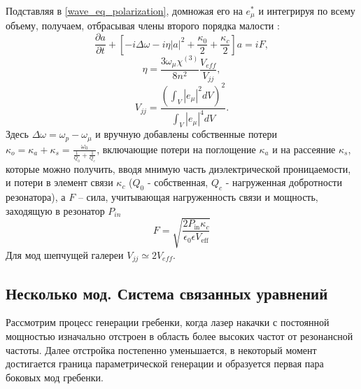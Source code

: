 Подставляя в \eqref{wave_eq_polarization}, домножая его на $e_\mu^*$ и интегрируя по всему объему, получаем, отбрасывая члены второго порядка малости \cite{Gorodetsky}:
\begin{equation}
\frac{\partial a}{\partial t}+[-i\Delta\omega-i\eta|a|^2+\frac{\kappa_0}{2}+\frac{\kappa_c}{2}]a=iF,
\end{equation}
\begin{equation}
\eta=\frac{3\omega_\mu\chi^{(3)}}{8n^2}\frac{V_{eff}}{V_{jj}},
\end{equation}
\begin{equation}
V_{jj}=\frac{(\int_V|e_\mu|^2dV)^2}{\int_V|e_\mu|^4dV}.
\end{equation}
Здесь $\Delta\omega=\omega_p-\omega_\mu$ и вручную добавлены собственные потери $\kappa_o=\kappa_a+\kappa_s=\frac{\omega_0}{\frac{1}{Q_0}+\frac{1}{Q_c}}$, включающие потери на поглощение $\kappa_a$ и на рассеяние $\kappa_s$, которые можно получить, вводя мнимую часть диэлектрической проницаемости, и потери в элемент связи $\kappa_c$ ($Q_0$ - собственная, $Q_c$ - нагруженная добротности резонатора), а $F$ -- сила, учитывающая нагруженность связи и мощность, заходящую в резонатор $P_{in}$
\begin{equation}
F=\sqrt{\frac{2P_{\text{in}}\kappa_c}{\epsilon_0\epsilon V_{\text{eff}}}}
\end{equation}
Для мод шепчущей галереи \cite{Gorodetsky} $V_{jj}\simeq 2V_{eff}$.

\subsection{Несколько мод. Система связанных уравнений}
Рассмотрим процесс генерации гребенки, когда лазер накачки с постоянной мощностью изначально отстроен в область более высоких частот от резонансной частоты. Далее отстройка постепенно уменьшается, в некоторый момент достигается граница параметрической генерации и образуется первая пара боковых мод гребенки.


